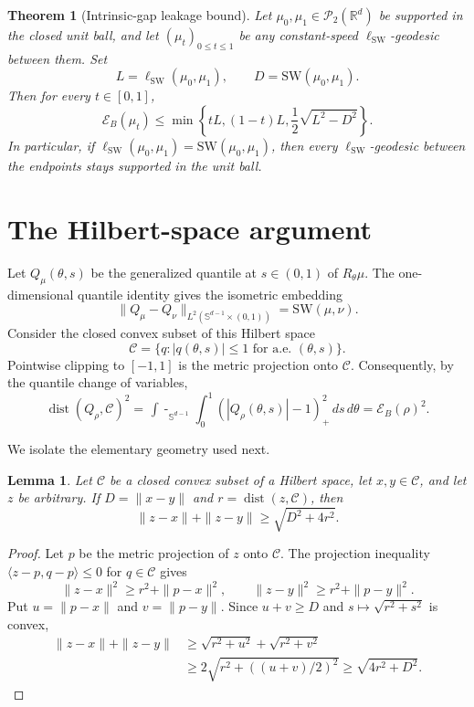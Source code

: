 \documentclass[11pt]{article}
\newtheorem{theorem}{Theorem}
\newtheorem{lemma}{Lemma}
\newcommand{\R}{\mathbb R}
\newcommand{\Pp}{\mathcal P_2}
\newcommand{\SW}{\mathrm{SW}}
\newcommand{\ellSW}{\ell_{\mathrm{SW}}}
\newcommand{\sphereavg}{\mathop{\int\!\!\!\!-}_{\mathbb S^{d-1}}}
\begin{document}
\begin{theorem}[Intrinsic-gap leakage bound]\label{thm:main}
Let $\mu_0,\mu_1\in\Pp(\R^d)$ be supported in the closed unit ball, and let
$(\mu_t)_{0\le t\le1}$ be any constant-speed $\ellSW$-geodesic between them.
Set
\[
 L=\ellSW(\mu_0,\mu_1),\qquad D=\SW(\mu_0,\mu_1).
\]
Then for every $t\in[0,1]$,
\begin{equation}\label{eq:main}
 \mathcal E_B(\mu_t)
 \le \min\left\{tL,(1-t)L,\frac12\sqrt{L^2-D^2}\right\}.
\end{equation}
In particular, if $\ellSW(\mu_0,\mu_1)=\SW(\mu_0,\mu_1)$, then every
$\ellSW$-geodesic between the endpoints stays supported in the unit ball.
\end{theorem}

\section{The Hilbert-space argument}

Let $Q_\mu(\theta,s)$ be the generalized quantile at $s\in(0,1)$ of
$R_\theta\mu$. The one-dimensional quantile identity gives the isometric
embedding
\begin{equation}\label{eq:embed}
 \|Q_\mu-Q_\nu\|_{L^2(\mathbb S^{d-1}\times(0,1))}
 =\SW(\mu,\nu).
\end{equation}
Consider the closed convex subset of this Hilbert space
\[
 \mathcal C=\{q: |q(\theta,s)|\le1\text{ for a.e. }(\theta,s)\}.
\]
Pointwise clipping to $[-1,1]$ is the metric projection onto $\mathcal C$.
Consequently, by the quantile change of variables,
\begin{equation}\label{eq:distC}
 \operatorname{dist}(Q_\rho,\mathcal C)^2
 =\sphereavg\int_0^1(|Q_\rho(\theta,s)|-1)_+^2\,ds\,d\theta
 =\mathcal E_B(\rho)^2.
\end{equation}

We isolate the elementary geometry used next.

\begin{lemma}\label{lem:hilbert}
Let $\mathcal C$ be a closed convex subset of a Hilbert space, let
$x,y\in\mathcal C$, and let $z$ be arbitrary. If
$D=\|x-y\|$ and $r=\operatorname{dist}(z,\mathcal C)$, then
\[
 \|z-x\|+\|z-y\|\ge\sqrt{D^2+4r^2}.
\]
\end{lemma}

\begin{proof}
Let $p$ be the metric projection of $z$ onto $\mathcal C$. The projection
inequality $\langle z-p,q-p\rangle\le0$ for $q\in\mathcal C$ gives
\[
 \|z-x\|^2\ge r^2+\|p-x\|^2,
 \qquad
 \|z-y\|^2\ge r^2+\|p-y\|^2.
\]
Put $u=\|p-x\|$ and $v=\|p-y\|$. Since $u+v\ge D$ and
$s\mapsto\sqrt{r^2+s^2}$ is convex,
\begin{align*}
 \|z-x\|+\|z-y\|
 &\ge \sqrt{r^2+u^2}+\sqrt{r^2+v^2}\\
 &\ge2\sqrt{r^2+((u+v)/2)^2}
 \ge\sqrt{4r^2+D^2}.
\end{align*}
\end{proof}
\end{document}
